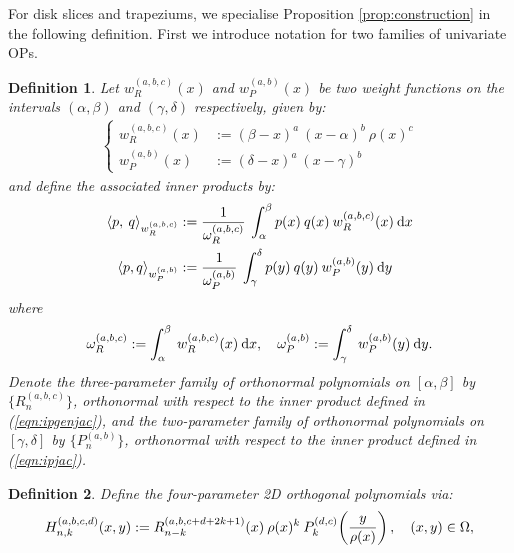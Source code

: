 \documentclass[11pt, oneside]{article}   	%
\newcommand{\hdop}{H}
\newcommand{\hdopnk}{\hdop_{n,k}}
\newcommand{\jac}{{P}}
\newcommand{\genjac}{R}
\newcommand{\genjacnmk}{\genjac_{n-k}}
\newcommand{\genjacw}{w_\genjac}
\newcommand{\jacw}{w_P}
\newcommand{\normgenjac}{\omega_\genjac}
\newcommand{\normjac}{\omega_P}
\newtheorem{definition}{Definition}
\begin{document}
For disk slices and trapeziums, we specialise Proposition \ref{prop:construction} in the following definition. First we introduce notation for two families of univariate OPs.
\begin{definition}\label{def:OPconstruction}
Let $\genjacw^{(a,b,c)}(x)$ and $\jacw^{(a,b)}(x)$ be two weight functions on the intervals $(\alpha, \beta)$ and $(\gamma, \delta)$ respectively, given by:
\begin{align*}
\begin{cases}
\genjacw^{(a,b,c)}(x) &:= (\beta - x)^a \: (x - \alpha)^{b} \: \rho(x)^{c} \\
\jacw^{(a,b)}(x) &:= (\delta-x)^a \: (x - \gamma)^b
\end{cases}
\end{align*}
and define the associated inner products by:
\begin{align}
	\ip< p, \: q >_{\genjacw^{(a,b,c)}} &:= \frac{1}{\normgenjac^{(a,b,c)}} \: \int_\alpha^\beta p(x) \: q(x) \: \genjacw^{(a,b,c)}(x) \: \D x \label{eqn:ipgenjac} \\
	\ip<p, q>_{\jacw^{(a,b)}} &:= \frac{1}{\normjac^{(a,b)}} \: \int_\gamma^\delta p(y) \: q(y) \: \jacw^{(a,b)}(y)\: \D y \label{eqn:ipjac}
\end{align}
where
\begin{align}
	\normgenjac^{(a,b,c)} := \int_\alpha^\beta \: \genjacw^{(a,b,c)}(x) \: \D x, \quad \normjac^{(a,b)} := \int_\gamma^\delta \: \jacw^{(a,b)}(y) \: \D y. \label{eqn:ipnormalisations}
\end{align}
Denote the three-parameter family of orthonormal polynomials on $[\alpha,\beta]$ by $\{\genjac_n^{(a,b,c)}\}$, orthonormal with respect to the inner product defined in (\ref{eqn:ipgenjac}), and the two-parameter family of orthonormal polynomials on $[\gamma,\delta]$ by $\{\jac_n^{(a,b)}\}$, orthonormal with respect to the inner product defined in (\ref{eqn:ipjac}).
\end{definition}

\begin{definition}\label{def:constuction}
Define the four-parameter 2D orthogonal polynomials via:
\begin{align*}
	\hdopnk^{(a,b,c,d)}(x,y) := \genjacnmk^{(a, b, c+d+2k+1)}(x) \: \rho(x)^k \: \jac_k^{(d,c)}\fpr(\frac{y}{\rho(x)}), \quad (x,y) \in \Omega, 
\end{align*}
\end{definition}
\end{document}
